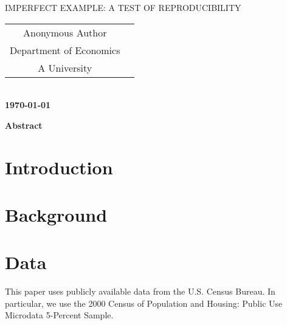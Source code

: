 \documentclass[12pt,titlepage]{article}
\date{\myversion
}
\makeatletter
\newcommand{\mytitle}{Imperfect Example: A Test of Reproducibility}
\newcommand{\mythanks}{
}
\def\blfootnote{\xdef\@thefnmark{}\@footnotetext}
\makeatother
\begin{document}

	\begin{titlepage}
		\begin{center}
			\Large\MakeUppercase{\mytitle} \\ [.5cm]
			\large
			\begin{tabular}{cc}
			Anonymous Author  \\
			Department of Economics  \\
			A University  

			\end{tabular} \\ [2cm]
			\textbf{\today\blfootnote{\mythanks}} \\ [2cm]
		\end{center}
\end{titlepage}



	\thispagestyle{empty}
	\singlespacing
		\begin{center}
			\textbf{Abstract} \\ [.5cm]
		\end{center}
		
	
	 \newpage
	 \setcounter{page}{1}
	\doublespacing
\section{Introduction}
\label{sec:intro}


\section{Background}
\label{sec:background}


\section{Data}
\label{sec:Data}

This paper uses publicly available data from the U.S. Census Bureau. In particular, we use the 2000 Census of Population and Housing: Public Use Microdata 5-Percent Sample. 
\end{document}
